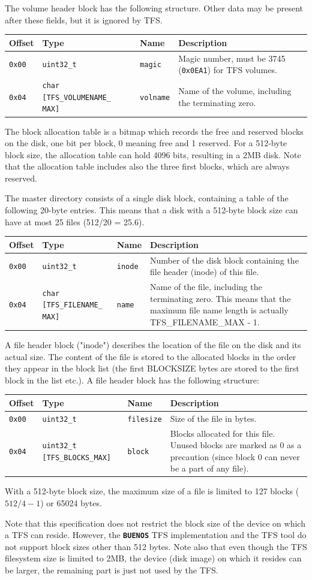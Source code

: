 \documentclass[twoside,a4paper]{report}
\newcommand{\PBS}[1]{\let\temp=\\#1\let\\=\temp}
\newlength{\tablewidth}
\newenvironment{formatdescription}{%
\begin{center}%
\begin{tabular}{p{1.2cm}|p{2.8cm}|p{1.5cm}|>{\PBS\raggedright}p{\tablewidth-8\tabcolsep-5.5cm}}%
\textbf{Offset} & \textbf{Type} & \textbf{Name} & \textbf{Description} \\ %
}{%
\end{tabular}%
\end{center}%
}
\newcommand{\formatfield}[4]{%
\hline%
\texttt{#1} & \texttt{#2} & \texttt{#3} & #4 \\%
}
\newcommand{\buenos}{\texttt{\textbf{BUENOS}}}
\begin{document}
The volume header block has the following structure. Other data may
be present after these fields, but it is ignored by TFS.

\begin{formatdescription}
\formatfield{0x00}{uint32\_t}{magic}{Magic number, must be 3745
(\texttt{0x0EA1}) for TFS volumes.}
\formatfield{0x04}{char [TFS\_VOLUMENAME\_ MAX]}{volname}{Name of the
volume, including the terminating zero.}
\end{formatdescription}


The block allocation table is a bitmap which records the free and
reserved blocks on the disk, one bit per block, 0 meaning free and 1
reserved. For a 512-byte block size, the allocation table can hold
4096 bits, resulting in a 2MB disk. Note that the allocation table
includes also the three first blocks, which are always reserved.

The master directory consists of a single disk block, containing a
table of the following 20-byte entries. This means that a disk with a
512-byte block size can have at most 25 files (512/20 = 25.6).


\begin{formatdescription}
\formatfield{0x00}{uint32\_t}{inode}{Number of the disk block
containing the file header (inode) of this file.}
\formatfield{0x04}{char [TFS\_FILENAME\_ MAX]}{name}{Name of the file,
including the terminating zero. This means that the maximum file name
length is actually TFS\_FILENAME\_MAX - 1.}
\end{formatdescription}

A file header block ("inode") describes the location of the file on
the disk and its actual size. The content of the file is stored to the
allocated blocks in the order they appear in the block list (the first
BLOCKSIZE bytes are stored to the first block in the list etc.). A
file header block has the following structure:

\begin{formatdescription}
\formatfield{0x00}{uint32\_t}{filesize}{Size of the file in bytes.}
\formatfield{0x04}{uint32\_t [TFS\_BLOCKS\_MAX]}{block}{Blocks
allocated for this file. Unused blocks are marked as 0 as a precaution
(since block 0 can never be a part of any file).}
\end{formatdescription}


With a 512-byte block size, the maximum size of a file is limited to
127 blocks ($512/4 - 1$) or 65024 bytes.

Note that this specification does not restrict the block size of the
device on which a TFS can reside. However, the \buenos{} TFS
implementation and the TFS tool do not support block sizes other than
512 bytes. Note also that even though the TFS filesystem size is
limited to 2MB, the device (disk image) on which it resides can be
larger, the remaining part is just not used by the TFS.
\end{document}
